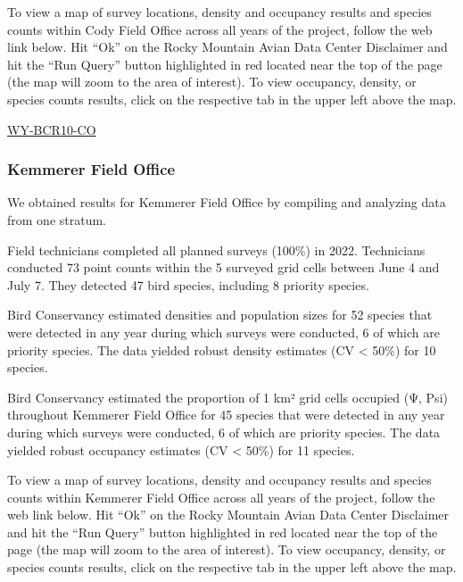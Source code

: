 \documentclass[
  letterpaper,
  DIV=11,
  numbers=noendperiod,
  oneside]{scrreprt}
\begin{document}
To view a map of survey locations, density and occupancy results and
species counts within Cody Field Office across all years of the project,
follow the web link below. Hit ``Ok'' on the Rocky Mountain Avian Data
Center Disclaimer and hit the ``Run Query'' button highlighted in red
located near the top of the page (the map will zoom to the area of
interest). To view occupancy, density, or species counts results, click
on the respective tab in the upper left above the map.

\href{http://www.rmbo.org/new_site/adc/QueryWindow.aspx\#N4IgzgLgTghhCuBbEAuABCA6gTQLQCEBhAJQEYAGXQgeXX3igFMZ40B7AMzQBkYA7ACZoAsvxgBzRokZ8IaXGkJsBATzQAxAJaMANkOocOmgMaMQAXyA}{WY-BCR10-CO}

\hypertarget{kemmerer-field-office}{%
\subsubsection{Kemmerer Field Office}\label{kemmerer-field-office}}

We obtained results for Kemmerer Field Office by compiling and analyzing
data from one stratum.

Field technicians completed all planned surveys (100\%) in 2022.
Technicians conducted 73 point counts within the 5 surveyed grid cells
between June 4 and July 7. They detected 47 bird species, including 8
priority species.

Bird Conservancy estimated densities and population sizes for 52 species
that were detected in any year during which surveys were conducted, 6 of
which are priority species. The data yielded robust density estimates
(CV \textless{} 50\%) for 10 species.

Bird Conservancy estimated the proportion of 1 km² grid cells occupied
(Ψ, Psi) throughout Kemmerer Field Office for 45 species that were
detected in any year during which surveys were conducted, 6 of which are
priority species. The data yielded robust occupancy estimates (CV
\textless{} 50\%) for 11 species.

To view a map of survey locations, density and occupancy results and
species counts within Kemmerer Field Office across all years of the
project, follow the web link below. Hit ``Ok'' on the Rocky Mountain
Avian Data Center Disclaimer and hit the ``Run Query'' button
highlighted in red located near the top of the page (the map will zoom
to the area of interest). To view occupancy, density, or species counts
results, click on the respective tab in the upper left above the map.
\end{document}

